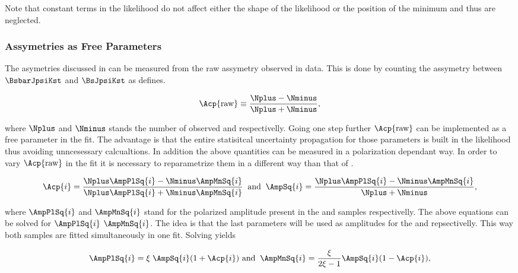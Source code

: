 \noindent Note that constant terms in the likelihood do not affect either the shape of the likelihood or the position of the minimum and thus
are neglected.


\subsubsection{\CP Assymetries as Free Parameters}
\label{cp_assymetries_and_total_decay_rate}
The \CP asymetries discussed in  can be measured from the raw assymetry observed in data.
This is done by counting the assymetry between $\BsbarJpsiKst$ and $\BsJpsiKst$ as  defines.

\begin{equation}
\Acp{\text{raw}} \equiv \frac{\Nplus - \Nminus}{\Nplus + \Nminus},
\label{acp_mes}
\end{equation}

\noindent where $\Nplus$ and $\Nminus$ stands the number of observed \BsbarJpsiKst and \BsJpsiKst respectivelly. 
Going one step further $\Acp{\text{raw}}$ can be implemented as a free parameter in the fit. The advantage
is that the entire statisitcal uncertainty propagation for those parameters is built in the likelihood thus avoiding
unncesessary calcualtions. In addition the above quantities can be measured in a polarization dependant way. In order
to vary $\Acp{\text{raw}}$ in the fit it is necessary to reparametrize them in a different way than that of .

\begin{equation}
\Acp{i} = \frac{\Nplus\AmpPlSq{i} - \Nminus\AmpMnSq{i}}{\Nplus\AmpPlSq{i} + \Nminus\AmpMnSq{i} }\;\; \text{and} \;\;
\AmpSq{i} = \frac{ \Nplus \AmpPlSq{i} - \Nminus\AmpMnSq{i}}{\Nplus + \Nminus},
\label{acp_param}
\end{equation}

\noindent where $\AmpPlSq{i}$ and $\AmpMnSq{i}$ stand for the polarized amplitude present in the \BsbarJpsiKst
and \BsJpsiKst samples respectivelly. The above equations can be solved for $\AmpPlSq{i}$  $\AmpMnSq{i}$. The idea
is that the last parameters will be used as amplitudes for the \BsbarJpsiKst and \BsJpsiKst \pdfs repsectivelly.
This way both samples are fitted simultaneously in one fit. Solving  yields 

\begin{equation}
\AmpPlSq{i} = \xi \; \AmpSq{i} (1+\Acp{i}) \,\, \text{and}\;\; \AmpMnSq{i} = \frac{\xi}{2\xi-1} \AmpSq{i} (1-\Acp{i}),
\label{acp_free}
\end{equation}

